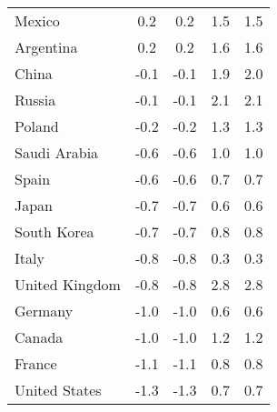 \begin{tabular}[t]{lcccc}
Mexico & 0.2 & 0.2 & 1.5 & 1.5\\
Argentina & 0.2 & 0.2 & 1.6 & 1.6\\
China & -0.1 & -0.1 & 1.9 & 2.0\\
Russia & -0.1 & -0.1 & 2.1 & 2.1\\
Poland & -0.2 & -0.2 & 1.3 & 1.3\\
Saudi Arabia & -0.6 & -0.6 & 1.0 & 1.0\\
Spain & -0.6 & -0.6 & 0.7 & 0.7\\
Japan & -0.7 & -0.7 & 0.6 & 0.6\\
South Korea & -0.7 & -0.7 & 0.8 & 0.8\\
Italy & -0.8 & -0.8 & 0.3 & 0.3\\
United Kingdom & -0.8 & -0.8 & 2.8 & 2.8\\
Germany & -1.0 & -1.0 & 0.6 & 0.6\\
Canada & -1.0 & -1.0 & 1.2 & 1.2\\
France & -1.1 & -1.1 & 0.8 & 0.8\\
United States & -1.3 & -1.3 & 0.7 & 0.7\\
\bottomrule
\end{tabular}